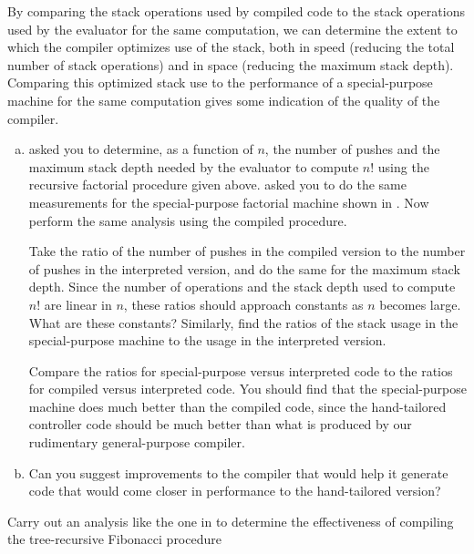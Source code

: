 \begin{exerciseGroup}
\label{Exercise 5.45}
 By comparing the stack operations
used by compiled code to the stack operations used by the evaluator for the
same computation, we can determine the extent to which the compiler optimizes
use of the stack, both in speed (reducing the total number of stack operations)
and in space (reducing the maximum stack depth).  Comparing this optimized
stack use to the performance of a special-purpose machine for the same
computation gives some indication of the quality of the compiler.

\begin{enumerate}[a.]

\item
{} asked you to determine, as a function of \( n \), the number
of pushes and the maximum stack depth needed by the evaluator to compute \( n! \)
using the recursive factorial procedure given above.   asked
you to do the same measurements for the special-purpose factorial machine shown
in . Now perform the same analysis using the compiled
 procedure.

Take the ratio of the number of pushes in the compiled version to the number of
pushes in the interpreted version, and do the same for the maximum stack depth.
Since the number of operations and the stack depth used to compute \( n! \)  are
linear in \( n \), these ratios should approach constants as \( n \) becomes large.
What are these constants?  Similarly, find the ratios of the stack usage in the
special-purpose machine to the usage in the interpreted version.

Compare the ratios for special-purpose versus interpreted code to the ratios
for compiled versus interpreted code.  You should find that the special-purpose
machine does much better than the compiled code, since the hand-tailored
controller code should be much better than what is produced by our rudimentary
general-purpose compiler.

\item
Can you suggest improvements to the compiler that would help it generate code
that would come closer in performance to the hand-tailored version?

\end{enumerate}

\label{Exercise 5.46}
 Carry out an analysis like the
one in  to determine the effectiveness of compiling the
tree-recursive Fibonacci procedure


\end{exerciseGroup}
